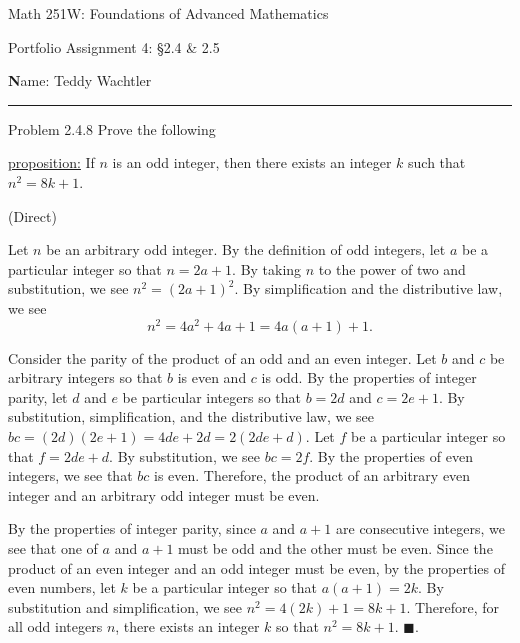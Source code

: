 \documentclass{article}
\theoremstyle{definition}
\renewcommand{\qed}{\blacksquare}
\begin{document}
	\begin{center}
		\Large{Math 251W: Foundations of Advanced Mathematics}

		\normalsize{Portfolio Assignment 4: \S 2.4 \& 2.5}

		\vspace{0.2cm}

		\hfill {\textbf Name:} Teddy Wachtler

		\vspace{0.25cm}
		\hrule
	\end{center}

	\vspace{0.3cm}


	\noindent Problem 2.4.8
	Prove the following
	\vspace{0.3cm}

	\underline{proposition:}
	If $n$ is an odd integer, then there exists an integer $k$ such that $n^2=8k+1$.

	\vspace{0.4cm}
	 (Direct)
	\vspace{0.2cm}

	Let $n$ be an arbitrary odd integer.
	By the definition of odd integers, let $a$ be a particular integer so that $n = 2a + 1$.
	By taking $n$ to the power of two and substitution, we see $n^2 = (2a + 1)^2$.
	By simplification and the distributive law, we see \[n^2 = 4a^2 + 4a + 1 = 4a(a + 1) + 1.\]

	Consider the parity of the product of an odd and an even integer.
	Let $b$ and $c$ be arbitrary integers so that $b$ is even and $c$ is odd.
	By the properties of integer parity, let $d$ and $e$ be particular integers so that $b = 2d$ and $c = 2e + 1$.
	By substitution, simplification, and the distributive law, we see $bc = (2d)(2e + 1) = 4de + 2d = 2(2de + d)$.
	Let $f$ be a particular integer so that $f = 2de + d$.
	By substitution, we see $bc = 2f$.
	By the properties of even integers, we see that $bc$ is even.
	Therefore, the product of an arbitrary even integer and an arbitrary odd integer must be even.

	By the properties of integer parity, since $a$ and $a + 1$ are consecutive integers, we see that one of $a$ and $a + 1$ must be odd and the other must be even.
	Since the product of an even integer and an odd integer must be even, by the properties of even numbers, let $k$ be a particular integer so that $a(a + 1) = 2k$.
	By substitution and simplification, we see $n^2 = 4(2k) + 1 = 8k + 1$.
	Therefore, for all odd integers $n$, there exists an integer $k$ so that $n^2 = 8k + 1$.
	$\qed$.

	\vspace{1cm}
\end{document}

